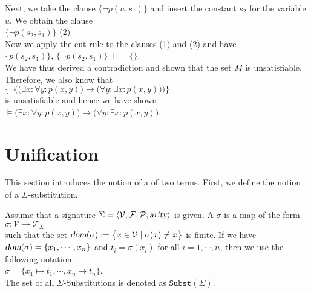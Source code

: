 Next, we take the clause $\big\{\neg p(u,s_1)\big\}$ and
insert the constant $s_2$ for the variable $u$.  We obtain the 
clause \\[0.2cm]
\hspace*{1.3cm} $\big\{\neg p(s_2,s_1)\big\}$ \hspace*{\fill} (2) \\[0.2cm]
Now we apply the cut rule to the clauses (1) and (2) and have \\[0.2cm]
\hspace*{1.3cm} 
$\big\{ p(s_2,s_1) \big\}$, \quad$\big\{\neg p(s_2,s_1)\big\}$ \quad $\vdash \quad \{\}$.
\\[0.2cm]
We have thus derived a contradiction and shown that the set $M$ is unsatisfiable.  Therefore, we also know that
\\[0.2cm]
\hspace*{1.3cm} 
$\Big\{ \neg \Big(\big(\exists x\colon \forall y\colon  p(x,y)\big) \rightarrow  \big(\forall y\colon \exists x\colon p(x,y)\big)\Big)\Big\}$
\\[0.2cm]
is unsatisfiable and hence we have shown \\[0.2cm]
\hspace*{1.3cm} 
$\models \big(\exists x\colon \forall y\colon  p(x,y)\big) \rightarrow  \big(\forall y\colon \exists x\colon p(x,y)\big)$.

\section{Unification}
This section introduces the notion of a  of two terms.
First, we define the notion of a $\Sigma$-substitution.

\begin{Definition}
  Assume that a signature $\Sigma = \langle \mathcal{V}, \mathcal{F}, \mathcal{P}, \textsl{arity} \rangle$ is given.
  A  $\sigma$ is a map of the form
  \\[0.2cm]
  \hspace*{1.3cm}
  $\sigma: \mathcal{V} \rightarrow \mathcal{T}_\Sigma$ 
  \\[0.2cm]
  such that the set $\textsl{dom}(\sigma) := \bigl\{ x \in \mathcal{V} \mid \sigma(x) \not= x \bigr\}$ is finite.
  If we have $\textsl{dom}(\sigma) = \{ x_1, \cdots, x_n \}$ and $t_i = \sigma(x_i)$ for all $i = 1, \cdots, n$,
  then we use the following notation:
  \\[0.2cm]
  \hspace*{1.3cm}
  $\sigma = \{ x_1 \mapsto t_1, \cdots, x_n \mapsto t_n \}$.
  \\[0.2cm]
  The set of all $\Sigma$-Substitutions is denoted as $\mathtt{Subst}(\Sigma)$.
  \eox
\end{Definition}

